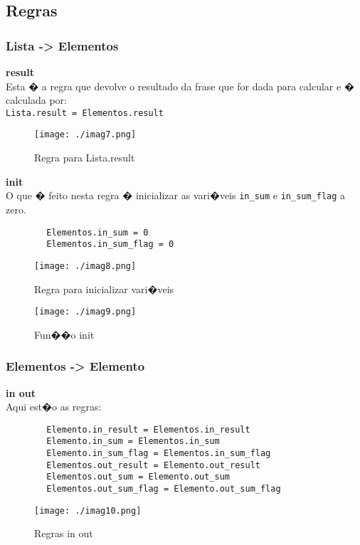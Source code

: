 \documentclass[a4paper]{article}
\begin{document}
\subsection{Regras}
\subsubsection{Lista -> Elementos}
\textbf{result}\\
Esta � a regra que devolve o resultado da frase que for dada para calcular e 
� calculada por: \\
\verb|Lista.result = Elementos.result|
\begin{figure}[H]
 \centering
 \texttt{[image: ./imag7.png]}
 \caption{Regra para Lista.result}
\end{figure}

\textbf{init}\\
O que � feito nesta regra � inicializar as vari�veis \verb|in_sum| e \verb|in_sum_flag| a zero.
\begin{verbatim}
        Elementos.in_sum = 0
        Elementos.in_sum_flag = 0 
\end{verbatim}

\begin{figure}[H]
 \centering
 \texttt{[image: ./imag8.png]}
 \caption{Regra para inicializar vari�veis}
\end{figure}

\begin{figure}[H]
 \centering
 \texttt{[image: ./imag9.png]}
 \caption{Fun��o init}
\end{figure}


\subsubsection{Elementos -> Elemento}
\textbf{in out}\\
Aqui est�o as regras:
\begin{verbatim}
        Elemento.in_result = Elementos.in_result
        Elemento.in_sum = Elementos.in_sum
        Elemento.in_sum_flag = Elementos.in_sum_flag
        Elementos.out_result = Elemento.out_result
        Elementos.out_sum = Elemento.out_sum
        Elementos.out_sum_flag = Elemento.out_sum_flag
\end{verbatim}

\begin{figure}[H]
 \centering
 \texttt{[image: ./imag10.png]}
 \caption{Regras in out}
\end{figure}
\end{document}
